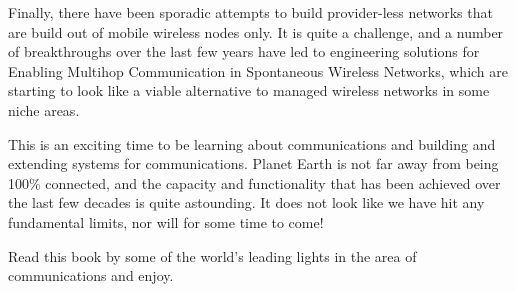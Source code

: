 Finally, there have been sporadic attempts to build provider-less
networks that are build out of mobile wireless nodes only. It is quite
a challenge, and a number of breakthroughs over the last few years have
led to engineering solutions for Enabling Multihop Communication in
Spontaneous Wireless Networks, which are starting to look like a
viable alternative to managed wireless networks in some niche areas.

This is an exciting time to be learning about communications and
building and extending systems for communications. Planet Earth is not
far away from being 100\% connected, and the capacity and functionality
that has been achieved over the last few decades is quite astounding.
It does not look like we have hit any fundamental limits, nor
will for some time to come!

Read this book by some of the world's leading lights in the area 
of communications and enjoy.

